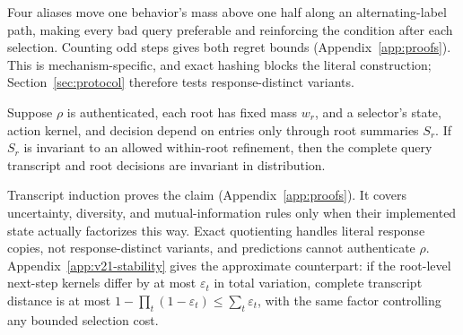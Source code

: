 Four aliases move one behavior's mass above one half along an alternating-label path, making every bad query preferable and reinforcing the condition after each selection. Counting odd steps gives both regret bounds (Appendix~\ref{app:proofs}). This is mechanism-specific, and exact hashing blocks the literal construction; Section~\ref{sec:protocol} therefore tests response-distinct variants.

\begin{proposition}
\label{prop:factorization}
Suppose $\rho$ is authenticated, each root has fixed mass $w_r$, and a selector's state, action kernel, and decision depend on entries only through root summaries $S_r$. If $S_r$ is invariant to an allowed within-root refinement, then the complete query transcript and root decisions are invariant in distribution.
\end{proposition}

Transcript induction proves the claim (Appendix~\ref{app:proofs}). It covers uncertainty, diversity, and mutual-information rules only when their implemented state actually factorizes this way. Exact quotienting handles literal response copies, not response-distinct variants, and predictions cannot authenticate $\rho$. Appendix~\ref{app:v21-stability} gives the approximate counterpart: if the root-level next-step kernels differ by at most $\varepsilon_t$ in total variation, complete transcript distance is at most $1-\prod_t(1-\varepsilon_t)\leq\sum_t\varepsilon_t$, with the same factor controlling any bounded selection cost.
